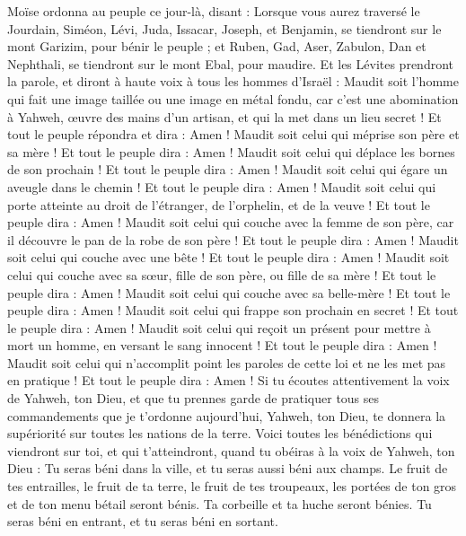\begin{multicols}{2}
Moïse ordonna au peuple ce jour-là, disant :
Lorsque vous aurez traversé le Jourdain, Siméon, Lévi, Juda, Issacar, Joseph, et Benjamin, se tiendront sur le mont Garizim, pour bénir le peuple ;
et Ruben, Gad, Aser, Zabulon, Dan et Nephthali, se tiendront sur le mont Ebal, pour maudire.
Et les Lévites prendront la parole, et diront à haute voix à tous les hommes d'Israël :
Maudit soit l'homme qui fait une image taillée ou une image en métal fondu, car c'est une abomination à Yahweh, œuvre des mains d'un artisan, et qui la met dans un lieu secret ! Et tout le peuple répondra et dira : Amen !
Maudit soit celui qui méprise son père et sa mère ! Et tout le peuple dira : Amen !
Maudit soit celui qui déplace les bornes de son prochain ! Et tout le peuple dira : Amen !
Maudit soit celui qui égare un aveugle dans le chemin ! Et tout le peuple dira : Amen !
Maudit soit celui qui porte atteinte au droit de l'étranger, de l'orphelin, et de la veuve ! Et tout le peuple dira : Amen !
Maudit soit celui qui couche avec la femme de son père, car il découvre le pan de la robe de son père ! Et tout le peuple dira : Amen !
Maudit soit celui qui couche avec une bête ! Et tout le peuple dira : Amen !
Maudit soit celui qui couche avec sa sœur, fille de son père, ou fille de sa mère ! Et tout le peuple dira : Amen !
Maudit soit celui qui couche avec sa belle-mère ! Et tout le peuple dira : Amen !
Maudit soit celui qui frappe son prochain en secret ! Et tout le peuple dira : Amen !
Maudit soit celui qui reçoit un présent pour mettre à mort un homme, en versant le sang innocent ! Et tout le peuple dira : Amen !
Maudit soit celui qui n'accomplit point les paroles de cette loi et ne les met pas en pratique ! Et tout le peuple dira : Amen !
\VerseOne{}Si tu écoutes attentivement la voix de Yahweh, ton Dieu, et que tu prennes garde de pratiquer tous ses commandements que je t'ordonne aujourd'hui, Yahweh, ton Dieu, te donnera la supériorité sur toutes les nations de la terre.
Voici toutes les bénédictions qui viendront sur toi, et qui t'atteindront, quand tu obéiras à la voix de Yahweh, ton Dieu :
Tu seras béni dans la ville, et tu seras aussi béni aux champs.
Le fruit de tes entrailles, le fruit de ta terre, le fruit de tes troupeaux, les portées de ton gros et de ton menu bétail seront bénis.
Ta corbeille et ta huche seront bénies.
Tu seras béni en entrant, et tu seras béni en sortant.

\end{multicols}
